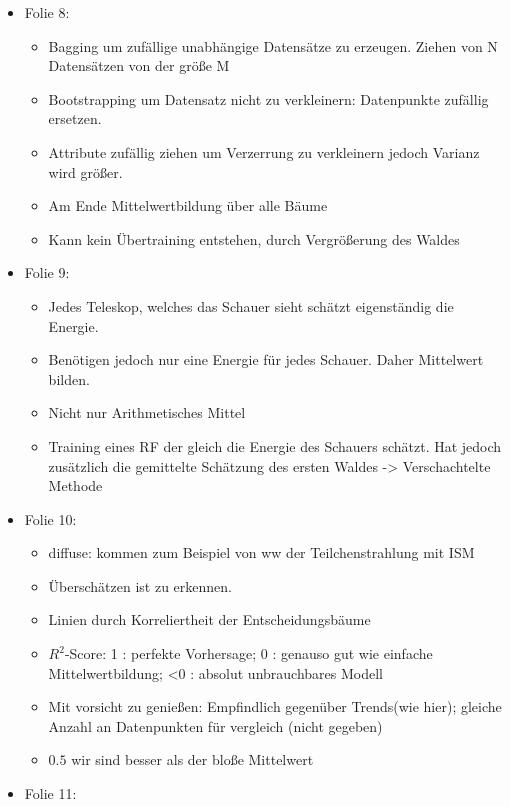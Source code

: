 \documentclass[
  bibliography=totoc,     %
  captions=tableheading,  %
  titlepage=firstiscover, %
]{scrartcl}
\begin{document}
\begin{itemize}
\begin{itemize}
      \end{itemize}
    \item Folie 8:
      \begin{itemize}
        \item Bagging um zufällige unabhängige Datensätze zu erzeugen. Ziehen von N Datensätzen von der größe M
        \item Bootstrapping um Datensatz nicht zu verkleinern: Datenpunkte zufällig ersetzen.
        \item Attribute zufällig ziehen um Verzerrung zu verkleinern jedoch Varianz wird größer.
        \item Am Ende Mittelwertbildung über alle Bäume
        \item Kann kein Übertraining entstehen, durch Vergrößerung des Waldes
      \end{itemize}
    \item Folie 9:
      \begin{itemize}
        \item Jedes Teleskop, welches das Schauer sieht schätzt eigenständig die Energie.
        \item Benötigen jedoch nur eine Energie für jedes Schauer. Daher Mittelwert bilden.
        \item Nicht nur Arithmetisches Mittel
        \item Training eines RF der gleich die Energie des Schauers schätzt. Hat jedoch zusätzlich die gemittelte Schätzung des ersten Waldes -> Verschachtelte Methode
      \end{itemize}
    \item Folie 10:
      \begin{itemize}
        \item diffuse: kommen zum Beispiel von ww der Teilchenstrahlung mit ISM
        \item Überschätzen ist zu erkennen.
        \item Linien durch Korreliertheit der Entscheidungsbäume
        \item $R^2$-Score: 1 : perfekte Vorhersage; 0 : genauso gut wie einfache Mittelwertbildung; <0 : absolut unbrauchbares Modell
        \item Mit vorsicht zu genießen: Empfindlich gegenüber Trends(wie hier); gleiche Anzahl an Datenpunkten für vergleich (nicht gegeben)
        \item $0.5$ wir sind besser als der bloße Mittelwert
      \end{itemize}
    \item Folie 11:

\end{itemize}
\end{document}
